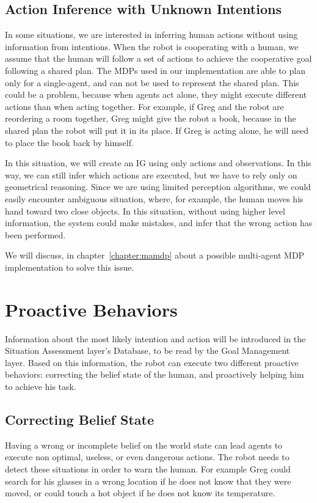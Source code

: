 \subsection{Action Inference with Unknown Intentions}
\label{subsec:intention-unknown_intentions}
In some situations, we are interested in inferring human actions without using information from intentions. When the robot is cooperating with a human, we assume that the human will follow a set of actions to achieve the cooperative goal following a shared plan. The MDPs used in our implementation are able to plan only for a single-agent, and can not be used to represent the shared plan. This could be a problem, because when agents act alone, they might execute different actions than when acting together. For example, if Greg and the robot are reordering a room together, Greg might give the robot a book, because in the shared plan the robot will put it in its place. If Greg is acting alone, he will need to place the book back by himself.  

In this situation, we will create an IG using only actions and observations. In this way, we can still infer which actions are executed, but we have to rely only on geometrical reasoning. Since we are using limited perception algorithms, we could easily encounter ambiguous situation, where, for example, the human moves his hand toward two close objects. In this situation, without using higher level information, the system could make mistakes, and infer that the wrong action has been performed.

We will discuss, in chapter~\ref{chapter:mamdp} about a possible multi-agent MDP implementation to solve this issue.

\section{Proactive Behaviors}
\label{sec:intention-proactive_behaviors}
Information about the most likely intention and action will be introduced in the Situation Assessment layer's Database, to be read by the Goal Management layer. Based on this information, the robot can execute two different proactive behaviors: correcting the belief state of the human, and proactively helping him to achieve his task.

\subsection{Correcting Belief State}
Having a wrong or incomplete belief on the world state can lead agents to execute non optimal, useless, or even dangerous actions. The robot needs to detect these situations in order to warn the human. For example Greg could search for his glasses in a wrong location if he does not know that they were moved, or could touch a hot object if he does not know its temperature.

